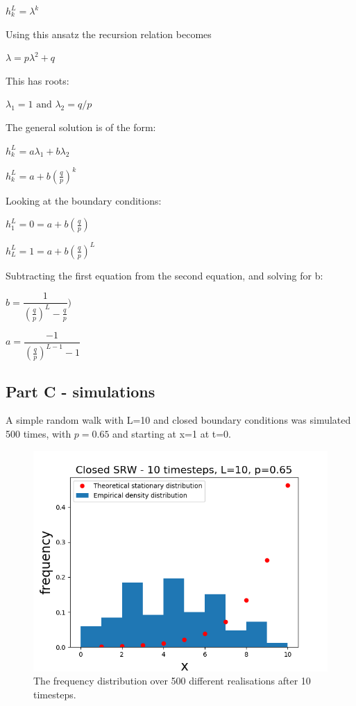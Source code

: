\documentclass{article}
\begin{document}
$h_{k}^L = \lambda^k $

Using this ansatz the recursion relation becomes

$\lambda = p \lambda^2 + q$

This has roots:

$\lambda_1 = 1 \text{ and } \lambda_2 = q/p$



The general solution is of the form:

$h_k^L = a\lambda_1 + b\lambda_2$ 

$h_k^L = a + b(\frac{q}{p})^k$ 


Looking at the boundary conditions:

$h_1^L = 0 = a + b(\frac{q}{p})$

$h_L^L = 1 = a + b(\frac{q}{p})^L$

Subtracting the first equation from the second equation, and solving for b:

$b = \dfrac{1}{(\frac{q}{p})^{L}-\frac{q}{p}})$

$a = \dfrac{-1}{(\frac{q}{p})^{L-1}-1}$


\subsection{Part C - simulations}

A simple random walk with L=10 and closed boundary conditions was simulated 500 times, with $p=0.65$ and starting at x=1 at t=0.

\begin{figure}[H]
\includegraphics[scale=0.8]{10_steps_b.png} 
\caption{The frequency distribution over 500 different realisations after 10 timesteps.}
\label{fig:10_steps}
\end{figure}
\end{document}
